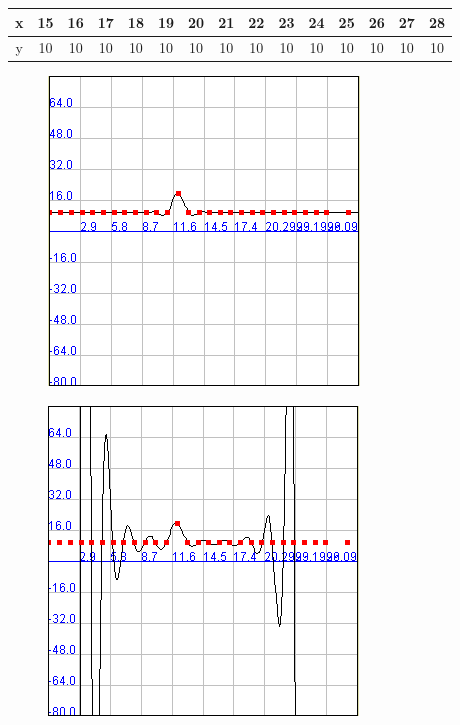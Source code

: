 \documentclass[a4paper]{article}
\begin{document}
\smallskip

\begin{tabular}{  | c || c | c | c | c | c | c | c | c | c | c | c | c | c | c | }
 \hline                 
   x&15& 16 & 17 & 18 & 19 & 20 & 21 & 22 & 23 & 24 & 25 & 26 & 27 & 28\\
 \hline    
y & 10 & 10 & 10& 10& 10& 10& 10& 10& 10& 10& 10& 10& 10& 10 \\
 \hline  
 \end{tabular}

\begin{figure}
	\caption{}
	\begin{center}
	\includegraphics[scale=1]{imagenes/SplinesX12a20}
	\label{SplinesX12a20}
  \end{center}
\end{figure}

\begin{figure}
	\caption{}
	\begin{center}
	\includegraphics[scale=1]{imagenes/LagrangeX12a20}
	\label{LagrangeX12a20}
  \end{center}
\end{figure}
\end{document}
